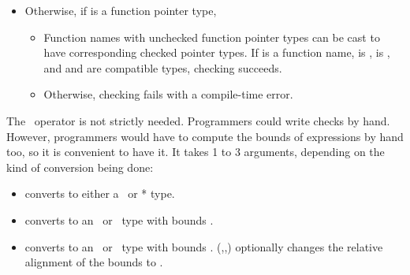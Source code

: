 \begin{itemize}
\item Otherwise, if  is a function pointer type,
\begin{itemize}
\item Function names with unchecked function pointer types can be cast to have corresponding checked
pointer types.  If  is a function name,  is \ptrT,  is ,
and  and  are compatible types, checking succeeds.
\item Otherwise, checking fails with a compile-time error.
\end{itemize}
\end{itemize}

The \dynamicboundscast\ operator is not strictly needed.
Programmers could write checks by hand.  However, programmers
would have to compute the bounds of expressions by hand too, so it is convenient to
have it. It takes 1 to 3 arguments, depending on the kind of conversion being done:
\begin{itemize}
\item
  converts  to either a \ptr\ or * type.
\item
   converts  to an \arrayptr\ or
  \spanptr\ type with bounds .  
\item
   converts  to an
  \arrayptr\ or \spanptr\ type with bounds
  .  
  {(,,)}
   optionally changes the relative alignment of the bounds to .
\end{itemize}

